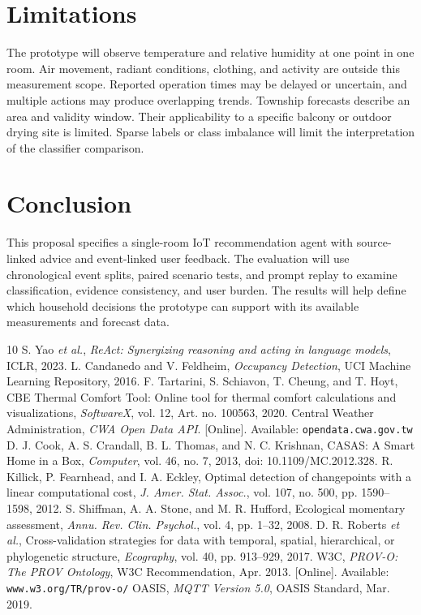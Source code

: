 \documentclass[conference]{IEEEtran}
\begin{document}
\section{Limitations}
The prototype will observe temperature and relative humidity at one point in one room. Air movement, radiant conditions, clothing, and activity are outside this measurement scope. Reported operation times may be delayed or uncertain, and multiple actions may produce overlapping trends. Township forecasts describe an area and validity window. Their applicability to a specific balcony or outdoor drying site is limited. Sparse labels or class imbalance will limit the interpretation of the classifier comparison.

\section{Conclusion}
This proposal specifies a single-room IoT recommendation agent with source-linked advice and event-linked user feedback. The evaluation will use chronological event splits, paired scenario tests, and prompt replay to examine classification, evidence consistency, and user burden. The results will help define which household decisions the prototype can support with its available measurements and forecast data.

\begin{thebibliography}{10}
 S. Yao \emph{et al.}, \emph{ReAct: Synergizing reasoning and acting in language models}, ICLR, 2023.
 L. Candanedo and V. Feldheim, \emph{Occupancy Detection}, UCI Machine Learning Repository, 2016.
 F. Tartarini, S. Schiavon, T. Cheung, and T. Hoyt, CBE Thermal Comfort Tool: Online tool for thermal comfort calculations and visualizations, \emph{SoftwareX}, vol. 12, Art. no. 100563, 2020.
 Central Weather Administration, \emph{CWA Open Data API}. [Online]. Available: \texttt{opendata.cwa.gov.tw}
 D. J. Cook, A. S. Crandall, B. L. Thomas, and N. C. Krishnan, CASAS: A Smart Home in a Box, \emph{Computer}, vol. 46, no. 7, 2013, doi: 10.1109/MC.2012.328.
 R. Killick, P. Fearnhead, and I. A. Eckley, Optimal detection of changepoints with a linear computational cost, \emph{J. Amer. Stat. Assoc.}, vol. 107, no. 500, pp. 1590--1598, 2012.
 S. Shiffman, A. A. Stone, and M. R. Hufford, Ecological momentary assessment, \emph{Annu. Rev. Clin. Psychol.}, vol. 4, pp. 1--32, 2008.
 D. R. Roberts \emph{et al.}, Cross-validation strategies for data with temporal, spatial, hierarchical, or phylogenetic structure, \emph{Ecography}, vol. 40, pp. 913--929, 2017.
 W3C, \emph{PROV-O: The PROV Ontology}, W3C Recommendation, Apr. 2013. [Online]. Available: \texttt{www.w3.org/TR/prov-o/}
 OASIS, \emph{MQTT Version 5.0}, OASIS Standard, Mar. 2019.
\end{thebibliography}
\end{document}
